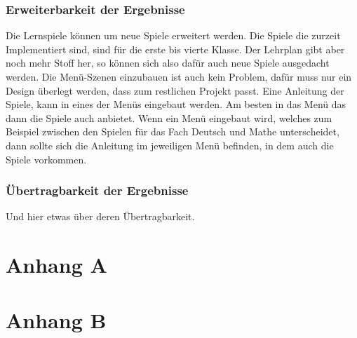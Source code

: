 \subsection{Erweiterbarkeit der Ergebnisse}
\label{sub:erweiterbarkeit}


Die Lernspiele können um neue Spiele erweitert werden. Die Spiele die zurzeit Implementiert sind, sind für die erste bis vierte Klasse. Der Lehrplan gibt aber noch mehr Stoff her, so können sich also dafür auch neue Spiele ausgedacht werden. Die Menü-Szenen einzubauen ist auch kein Problem, dafür muss nur ein Design überlegt werden, dass zum restlichen Projekt passt. Eine Anleitung der Spiele, kann in eines der Menüs eingebaut werden. Am besten in das Menü das dann die Spiele auch anbietet. Wenn ein Menü eingebaut wird, welches zum Beispiel zwischen den Spielen für das Fach Deutsch und Mathe unterscheidet, dann sollte sich die Anleitung im jeweiligen Menü befinden, in dem auch die Spiele vorkommen.\\

\subsection{Übertragbarkeit der Ergebnisse}
\label{sub:uebertragbarkeit}

Und hier etwas über deren Übertragbarkeit.

\appendix

\printbibliography[heading=bibintoc]

\chapter{Anhang A}

\chapter{Anhang B}


